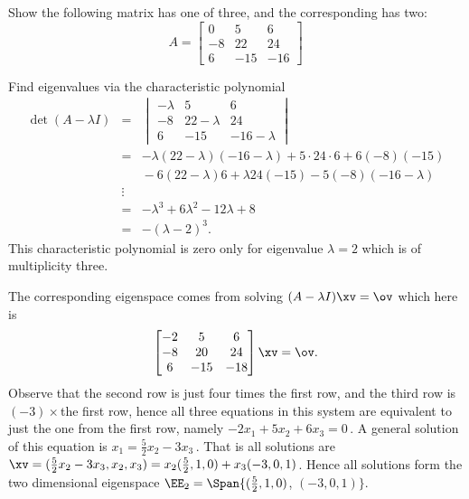 \begin{example} 
Show the following matrix has one  of  three, and the corresponding  has  two:
\begin{equation*}
A=\begin{bmatrix}0&5&6
\\-8&22&24
\\6&-15&-16 \end{bmatrix}
\end{equation*}
\begin{solution} 
Find eigenvalues via the characteristic polynomial
\begin{eqnarray*}
\det(A-\lambda I)
&=&
\begin{vmatrix} -\lambda&5&6
\\-8&22-\lambda&24
\\6&-15&-16-\lambda \end{vmatrix}
\\&=&-\lambda(22-\lambda)(-16-\lambda)+5\cdot24\cdot6+6(-8)(-15)
\\&&{}-6(22-\lambda)6+\lambda24(-15)-5(-8)(-16-\lambda)
\\&\vdots&
\\&=&-\lambda^3+6\lambda^2-12\lambda+8
\\&=&-(\lambda-2)^3.
\end{eqnarray*}
This characteristic polynomial is zero only for eigenvalue \(\lambda=2\) which is of multiplicity three.

The corresponding eigenspace comes from solving \((A-\lambda I)\xv=\ov\) which here is
\begin{equation*}
\begin{bmatrix}-2&5&6
\\-8&20&24
\\6&-15&-18 \end{bmatrix}\xv=\ov.
\end{equation*}
Observe that the second row is just four times the first row, and the third row is \((-3)\times{}\)the first row, hence all three equations in this system are equivalent to just the one from the first row, namely \(-2x_1+5x_2+6x_3=0\)\,.
A general solution of this equation is \(x_1=\tfrac52x_2-3x_3\)\,.
That is all solutions are \(\xv=(\tfrac52x_2-3x_3,x_2,x_3)=x_2(\tfrac52,1,0)+x_3(-3,0,1)\). 
Hence all solutions form the two dimensional eigenspace 
\(\EE_2=\Span\{(\tfrac52,1,0)\), \((-3,0,1)\}\).
\end{solution}
\end{example}



